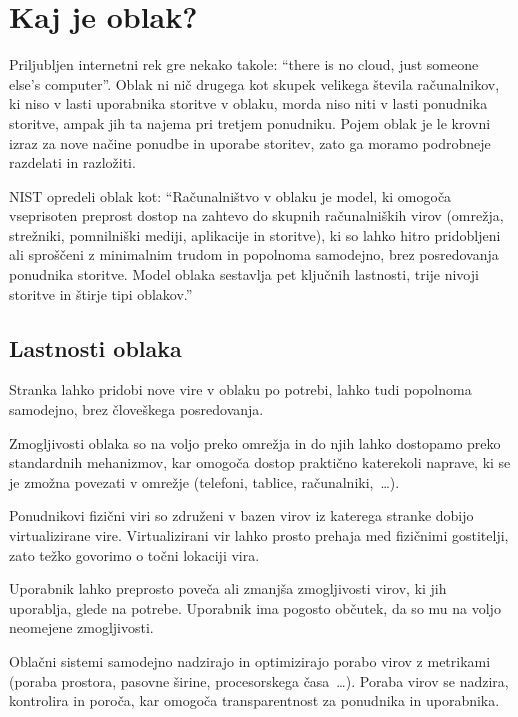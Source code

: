 \documentclass[12pt,a4paper,openany,tikz]{book}
\theoremstyle{plain}
\theoremstyle{definition}
\begin{document}
\section{Kaj je oblak?}
\label{sec:Kaj je oblak?}


Priljubljen internetni rek gre nekako takole: “there is no cloud, just someone else's computer”. Oblak ni nič drugega kot skupek velikega števila računalnikov, ki niso v lasti uporabnika storitve v oblaku, morda niso niti v lasti ponudnika storitve, ampak jih ta najema pri tretjem ponudniku. Pojem oblak je le krovni izraz za nove načine ponudbe in uporabe storitev, zato ga moramo podrobneje razdelati in razložiti.

NIST opredeli oblak kot: ``Računalništvo v oblaku je model, ki omogoča vseprisoten preprost dostop na zahtevo do skupnih računalniških virov (omrežja, strežniki, pomnilniški mediji, aplikacije in storitve), ki so lahko hitro pridobljeni ali sproščeni z minimalnim trudom in popolnoma samodejno, brez posredovanja ponudnika storitve. Model oblaka sestavlja pet ključnih lastnosti, trije nivoji storitve in štirje tipi oblakov.''~\cite{mell2011nist}

\subsection{Lastnosti oblaka}
\label{sub:Lastnosti oblaka}

\begin{description}[style=nextline]
   \item[Storitev na zahtevo] Stranka lahko pridobi nove vire v oblaku po potrebi, lahko tudi popolnoma samodejno, brez človeškega posredovanja.

   \item[Širok dostop preko omrežja] Zmogljivosti oblaka so na voljo preko omrežja in do njih lahko dostopamo preko standardnih mehanizmov, kar omogoča dostop praktično katerekoli naprave, ki se je zmožna povezati v omrežje (telefoni, tablice, računalniki,~\ldots).

   \item[Uporaba skupnih virov] Ponudnikovi fizični viri so združeni v bazen virov iz katerega stranke dobijo virtualizirane vire. Virtualizirani vir lahko prosto prehaja med fizičnimi gostitelji, zato težko govorimo o točni lokaciji vira.

   \item[Bliskovita prožnost] Uporabnik lahko preprosto poveča ali zmanjša zmogljivosti virov, ki jih uporablja, glede na potrebe. Uporabnik ima pogosto občutek, da so mu na voljo neomejene zmogljivosti.

   \item[Merjenje porabe in obračun glede na porabo virov]  Oblačni sistemi samodejno nadzirajo in optimizirajo porabo virov z metrikami (poraba prostora, pasovne širine, procesorskega časa~\ldots). Poraba virov se nadzira, kontrolira in poroča, kar omogoča transparentnost za ponudnika in uporabnika.
\end{description}
\end{document}
